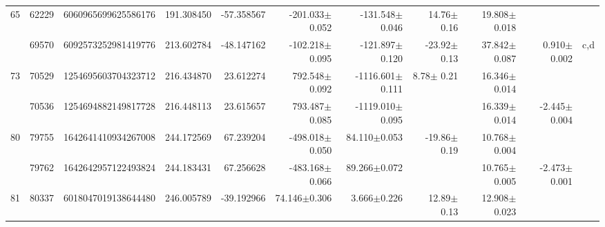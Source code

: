 \documentclass{ws-ijmpd}
\begin{document}
\begin{landscape}
\begin{longtable}{rrrrrrrrrrl}
  \hline 65 &   62229 &      6060965699625586176 &                   191.308450 &                   -57.358567 &               -201.033$\pm$0.052 &               -131.548$\pm$0.046 &          14.76$\pm$  0.16 &        19.808$\pm$0.018 &                                           &                                                    \\
            &   69570 &      6092573252981419776 &                   213.602784 &                   -48.147162 &               -102.218$\pm$0.095 &               -121.897$\pm$0.120 &         -23.92$\pm$  0.13 &        37.842$\pm$0.087 &                           0.910$\pm$0.002 &                                                c,d \\
  \hline 73 &   70529 &      1254695603704323712 &                   216.434870 &                    23.612274 &                792.548$\pm$0.092 &              -1116.601$\pm$0.111 &           8.78$\pm$  0.21 &        16.346$\pm$0.014 &                                           &                                                    \\
            &   70536 &      1254694882149817728 &                   216.448113 &                    23.615657 &                793.487$\pm$0.085 &              -1119.010$\pm$0.095 &                           &        16.339$\pm$0.014 &                          -2.445$\pm$0.004 &                                                    \\
  \hline 80 &   79755 &      1642641410934267008 &                   244.172569 &                    67.239204 &               -498.018$\pm$0.050 &                 84.110$\pm$0.053 &         -19.86$\pm$  0.19 &        10.768$\pm$0.004 &                                           &                                                    \\
            &   79762 &      1642642957122493824 &                   244.183431 &                    67.256628 &               -483.168$\pm$0.066 &                 89.266$\pm$0.072 &                           &        10.765$\pm$0.005 &                          -2.473$\pm$0.001 &                                                    \\
  \hline 81 &   80337 &      6018047019138644480 &                   246.005789 &                   -39.192966 &                 74.146$\pm$0.306 &                  3.666$\pm$0.226 &          12.89$\pm$  0.13 &        12.908$\pm$0.023 &                                           &                                                    \\

\end{longtable}
\end{landscape}
\end{document}
